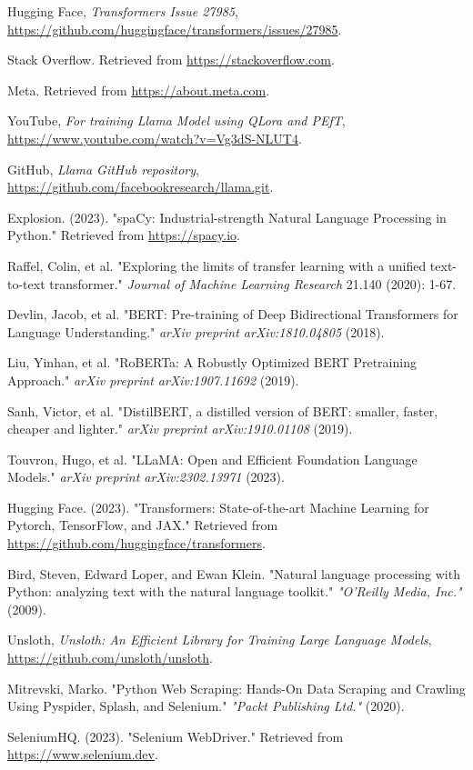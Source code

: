 \documentclass[conference]{IEEEtran}
\begin{document}
\begin{thebibliography}{1}
    Hugging Face, \emph{Transformers Issue 27985}, \href{https://github.com/huggingface/transformers/issues/27985}{https://github.com/huggingface/transformers/issues/27985}.

    Stack Overflow. Retrieved from \url{https://stackoverflow.com}.

    Meta. Retrieved from \url{https://about.meta.com}.

    YouTube, \emph{For training Llama Model using QLora and PEfT}, \href{https://www.youtube.com/watch?v=Vg3dS-NLUT4}{https://www.youtube.com/watch?v=Vg3dS-NLUT4}.

    GitHub, \emph{Llama GitHub repository}, \href{https://github.com/facebookresearch/llama.git}{https://github.com/facebookresearch/llama.git}.

    Explosion. (2023). "spaCy: Industrial-strength Natural Language Processing in Python." Retrieved from \url{https://spacy.io}.

    Raffel, Colin, et al. "Exploring the limits of transfer learning with a unified text-to-text transformer." \emph{Journal of Machine Learning Research} 21.140 (2020): 1-67.

    Devlin, Jacob, et al. "BERT: Pre-training of Deep Bidirectional Transformers for Language Understanding." \emph{arXiv preprint arXiv:1810.04805} (2018).

    Liu, Yinhan, et al. "RoBERTa: A Robustly Optimized BERT Pretraining Approach." \emph{arXiv preprint arXiv:1907.11692} (2019).

    Sanh, Victor, et al. "DistilBERT, a distilled version of BERT: smaller, faster, cheaper and lighter." \emph{arXiv preprint arXiv:1910.01108} (2019).

    Touvron, Hugo, et al. "LLaMA: Open and Efficient Foundation Language Models." \emph{arXiv preprint arXiv:2302.13971} (2023).

    Hugging Face. (2023). "Transformers: State-of-the-art Machine Learning for Pytorch, TensorFlow, and JAX." Retrieved from \url{https://github.com/huggingface/transformers}.

    Bird, Steven, Edward Loper, and Ewan Klein. "Natural language processing with Python: analyzing text with the natural language toolkit." \emph{"O'Reilly Media, Inc."} (2009).

    Unsloth, \emph{Unsloth: An Efficient Library for Training Large Language Models}, \href{https://github.com/unsloth/unsloth}{https://github.com/unsloth/unsloth}.

    Mitrevski, Marko. "Python Web Scraping: Hands-On Data Scraping and Crawling Using Pyspider, Splash, and Selenium." \emph{"Packt Publishing Ltd."} (2020).

    SeleniumHQ. (2023). "Selenium WebDriver." Retrieved from \url{https://www.selenium.dev}.

\end{thebibliography}
\end{document}

